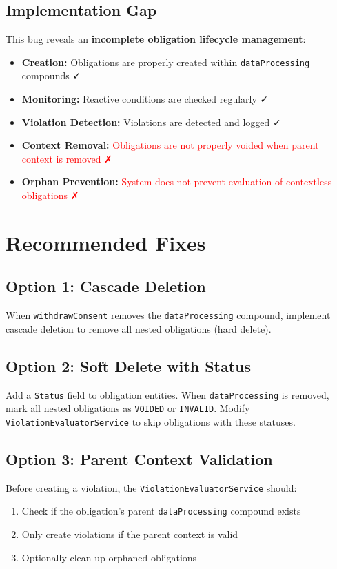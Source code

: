 \documentclass[11pt,a4paper]{article}
\begin{document}
\subsection{Implementation Gap}

This bug reveals an \textbf{incomplete obligation lifecycle management}:

\begin{itemize}
    \item \textbf{Creation:} Obligations are properly created within \texttt{dataProcessing} compounds ✓
    \item \textbf{Monitoring:} Reactive conditions are checked regularly ✓
    \item \textbf{Violation Detection:} Violations are detected and logged ✓
    \item \textbf{Context Removal:} \textcolor{red}{Obligations are not properly voided when parent context is removed ✗}
    \item \textbf{Orphan Prevention:} \textcolor{red}{System does not prevent evaluation of contextless obligations ✗}
\end{itemize}

\section{Recommended Fixes}

\subsection{Option 1: Cascade Deletion}
When \texttt{withdrawConsent} removes the \texttt{dataProcessing} compound, implement cascade deletion to remove all nested obligations (hard delete).

\subsection{Option 2: Soft Delete with Status}
Add a \texttt{Status} field to obligation entities. When \texttt{dataProcessing} is removed, mark all nested obligations as \texttt{VOIDED} or \texttt{INVALID}. Modify \texttt{ViolationEvaluatorService} to skip obligations with these statuses.

\subsection{Option 3: Parent Context Validation}
Before creating a violation, the \texttt{ViolationEvaluatorService} should:
\begin{enumerate}
    \item Check if the obligation's parent \texttt{dataProcessing} compound exists
    \item Only create violations if the parent context is valid
    \item Optionally clean up orphaned obligations
\end{enumerate}
\end{document}
